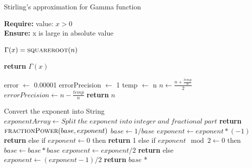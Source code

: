 \documentclass[12pt,a4paper]{report}
\begin{document}
\begin{algorithm}

\caption{Stirling's approximation for Gamma function}

\textbf{Require:}  value: $x > 0$ \\
\textbf{Ensure:} x is large in absolute value
\begin{algorithmic}[1]

    \State \indent $\Gamma (x) = \Call{squareroot}{n}$  
    
    \State \textbf{return} $\Gamma (x)$
    
    \State error $\leftarrow$ 0.00001
    \State errorPrecision $\leftarrow$ 1
    \State temp $\leftarrow$ n
        \State $n \leftarrow \frac{{n}+ \frac{temp}{n}}{2}$
        \State $errorPrecision \leftarrow n - \frac{temp}{n}$
    \EndWhile
    \State \textbf{return} $n$
    \EndProcedure
    
    \State Convert the exponent into String
    \State $exponentArray \leftarrow Split\; the\; exponent\; into\; integer\; and\; fractional\; part $
     \State \qquad \textbf{return} $\Call{fractionPower}{base, exponent}$ 
     \EndIf
     \State \qquad $base \leftarrow 1/base$
     \State \qquad $exponent \leftarrow exponent * (-1)$
     \State \textbf{return}  
     \EndIf
     \State else if $exponent \leftarrow 0$ then
     \State \qquad \textbf{return} 1 
     \State else if  $exponent \mod  2 \leftarrow 0$ then 
     \State \qquad $base \leftarrow base * base $
     \State \qquad $exponent \leftarrow exponent/2 $
     \State \textbf{return}  
     \State else
     \State \qquad $exponent \leftarrow (exponent-1)/2$
     \State \textbf{return}\; $base$ *  
    \EndProcedure

\EndProcedure
\end{algorithmic}
\end{algorithm}
\end{document}
